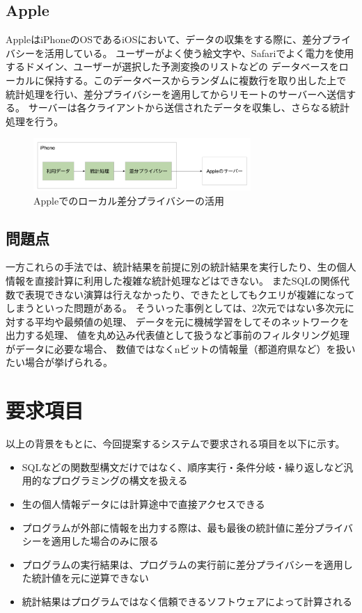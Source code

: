 \documentclass[a4paper,11pt]{jreport}
\begin{document}
\subsection{Apple}

AppleはiPhoneのOSであるiOSにおいて、データの収集をする際に、差分プライバシーを活用している。\cite{apple}
ユーザーがよく使う絵文字や、Safariでよく電力を使用するドメイン、ユーザーが選択した予測変換のリストなどの
データベースをローカルに保持する。このデータベースからランダムに複数行を取り出した上で
統計処理を行い、差分プライバシーを適用してからリモートのサーバーへ送信する。
サーバーは各クライアントから送信されたデータを収集し、さらなる統計処理を行う。

\begin{figure}[htbp]
    \centering
\includegraphics[height=20mm]{apple.png}
    \caption{Appleでのローカル差分プライバシーの活用}
    \label{fig:apple}
\end{figure}

\subsection{問題点}

一方これらの手法では、統計結果を前提に別の統計結果を実行したり、生の個人情報を直接計算に利用した複雑な統計処理などはできない。
またSQLの関係代数で表現できない演算は行えなかったり、できたとしてもクエリが複雑になってしまうといった問題がある。
そういった事例としては、2次元ではない多次元に対する平均や最頻値の処理、
データを元に機械学習をしてそのネットワークを出力する処理、
値を丸め込み代表値として扱うなど事前のフィルタリング処理がデータに必要な場合、
数値ではなくnビットの情報量（都道府県など）を扱いたい場合が挙げられる。

\section{要求項目}

以上の背景をもとに、今回提案するシステムで要求される項目を以下に示す。
\begin{itemize}
    \item SQLなどの関数型構文だけではなく、順序実行・条件分岐・繰り返しなど汎用的なプログラミングの構文を扱える
    \item 生の個人情報データには計算途中で直接アクセスできる
    \item プログラムが外部に情報を出力する際は、最も最後の統計値に差分プライバシーを適用した場合のみに限る
    \item プログラムの実行結果は、プログラムの実行前に差分プライバシーを適用した統計値を元に逆算できない
    \item 統計結果はプログラムではなく信頼できるソフトウェアによって計算される
\end{itemize}
\end{document}
